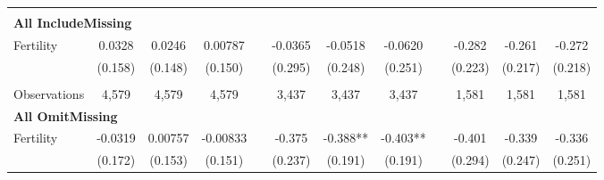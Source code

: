 \begin{landscape}
\begin{table}[htpb!]
\begin{center}
\begin{tabular}{lcccp{2mm}cccp{2mm}ccc}
\begin{footnotesize}\end{footnotesize}\\ 
\multicolumn{12}{l}{\textbf{All IncludeMissing}}\\ 
Fertility&0.0328&0.0246&0.00787&&-0.0365&-0.0518&-0.0620&&-0.282&-0.261&-0.272\\
&(0.158)&(0.148)&(0.150)&&(0.295)&(0.248)&(0.251)&&(0.223)&(0.217)&(0.218)\\
\begin{footnotesize}\end{footnotesize}&\begin{footnotesize}\end{footnotesize}&\begin{footnotesize}\end{footnotesize}&\begin{footnotesize}\end{footnotesize}&\begin{footnotesize}\end{footnotesize}&\begin{footnotesize}\end{footnotesize}&\begin{footnotesize}\end{footnotesize}&\begin{footnotesize}\end{footnotesize}&\begin{footnotesize}\end{footnotesize}&\begin{footnotesize}\end{footnotesize}&\begin{footnotesize}\end{footnotesize}&\begin{footnotesize}\end{footnotesize}\\Observations&4,579&4,579&4,579&&3,437&3,437&3,437&&1,581&1,581&1,581\\
\multicolumn{12}{l}{\textbf{All OmitMissing}}\\ 
Fertility&-0.0319&0.00757&-0.00833&&-0.375&-0.388**&-0.403**&&-0.401&-0.339&-0.336\\
&(0.172)&(0.153)&(0.151)&&(0.237)&(0.191)&(0.191)&&(0.294)&(0.247)&(0.251)\\

\end{tabular}
\end{center}
\end{table}
\end{landscape}
